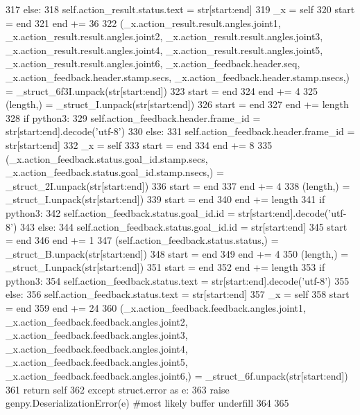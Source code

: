 \begin{DoxyCode}
317       \textcolor{keywordflow}{else}:
318         self.action\_result.status.text = str[start:end]
319       \_x = self
320       start = end
321       end += 36
322       (\_x.action\_result.result.angles.joint1, \_x.action\_result.result.angles.joint2, 
      \_x.action\_result.result.angles.joint3, \_x.action\_result.result.angles.joint4, \_x.action\_result.result.angles.joint5, 
      \_x.action\_result.result.angles.joint6, \_x.action\_feedback.header.seq, \_x.action\_feedback.header.stamp.secs, 
      \_x.action\_feedback.header.stamp.nsecs,) = \_struct\_6f3I.unpack(str[start:end])
323       start = end
324       end += 4
325       (length,) = \_struct\_I.unpack(str[start:end])
326       start = end
327       end += length
328       \textcolor{keywordflow}{if} python3:
329         self.action\_feedback.header.frame\_id = str[start:end].decode(\textcolor{stringliteral}{'utf-8'})
330       \textcolor{keywordflow}{else}:
331         self.action\_feedback.header.frame\_id = str[start:end]
332       \_x = self
333       start = end
334       end += 8
335       (\_x.action\_feedback.status.goal\_id.stamp.secs, \_x.action\_feedback.status.goal\_id.stamp.nsecs,) = 
      \_struct\_2I.unpack(str[start:end])
336       start = end
337       end += 4
338       (length,) = \_struct\_I.unpack(str[start:end])
339       start = end
340       end += length
341       \textcolor{keywordflow}{if} python3:
342         self.action\_feedback.status.goal\_id.id = str[start:end].decode(\textcolor{stringliteral}{'utf-8'})
343       \textcolor{keywordflow}{else}:
344         self.action\_feedback.status.goal\_id.id = str[start:end]
345       start = end
346       end += 1
347       (self.action\_feedback.status.status,) = \_struct\_B.unpack(str[start:end])
348       start = end
349       end += 4
350       (length,) = \_struct\_I.unpack(str[start:end])
351       start = end
352       end += length
353       \textcolor{keywordflow}{if} python3:
354         self.action\_feedback.status.text = str[start:end].decode(\textcolor{stringliteral}{'utf-8'})
355       \textcolor{keywordflow}{else}:
356         self.action\_feedback.status.text = str[start:end]
357       \_x = self
358       start = end
359       end += 24
360       (\_x.action\_feedback.feedback.angles.joint1, \_x.action\_feedback.feedback.angles.joint2, 
      \_x.action\_feedback.feedback.angles.joint3, \_x.action\_feedback.feedback.angles.joint4, 
      \_x.action\_feedback.feedback.angles.joint5, \_x.action\_feedback.feedback.angles.joint6,) = \_struct\_6f.unpack(str[start:end])
361       \textcolor{keywordflow}{return} self
362     \textcolor{keywordflow}{except} struct.error \textcolor{keyword}{as} e:
363       \textcolor{keywordflow}{raise} genpy.DeserializationError(e) \textcolor{comment}{#most likely buffer underfill}
364 
365 
\end{DoxyCode}
